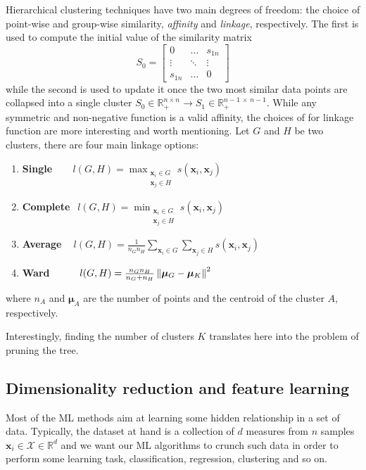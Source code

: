	Hierarchical clustering techniques have two main degrees of freedom: the choice of point-wise and group-wise similarity, \aka \textit{affinity} and \textit{linkage}, respectively. The first is used to compute the initial value of the similarity matrix
	$$
	S_0 = \begin{bmatrix}
	0       & \dots & s_{1n} \\
	\vdots & \ddots & \vdots \\
	s_{1n}       & \dots & 0
	\end{bmatrix}
	$$
	while the second is used to update it once the two most similar data points are collapsed into a single cluster $S_0 \in \mathbb{R}_+^{n \times n} \rightarrow S_1 \in \mathbb{R}_+^{n-1\,\times\,n-1}$.
	While any symmetric and non-negative function is a valid affinity, the choices of for linkage function are more interesting and worth mentioning.
	Let $G$ and $H$ be two clusters, there are four main linkage options:
	\begin{enumerate}
		\item[] \textbf{Single} $~~~~~~~~l(G,H) = \max_{\substack{\bm{x}_i \in G \\ \bm{x}_j \in H}} s(\bm{x}_i, \bm{x}_j)$

		\item[] \textbf{Complete} $~~l(G,H) = \min_{\substack{\bm{x}_i \in G \\ \bm{x}_j \in H}} s(\bm{x}_i, \bm{x}_j)$
		
		\item[] \textbf{Average} $~~~~l(G,H) = \frac{1}{n_G n_H} \sum_{\bm{x}_i \in G} \sum_{\bm{x}_j \in H} s(\bm{x}_i, \bm{x}_j)$
		
		\item[] \textbf{Ward} $~~~~~~~~l(G,H) = \frac{n_G n_H}{n_G + n_H} \left\lVert\bm{\mu}_G - \bm{\mu}_K\right\rVert^2$
	\end{enumerate}
	where $n_A$ and $\bm{\mu}_A$ are the number of points and the centroid of the cluster $A$, respectively.
	
	Interestingly, finding the number of clusters $K$ translates here into the problem of pruning the tree.
    
    \subsection{Dimensionality reduction and feature learning} \label{sec:dimred}
	Most of the ML methods aim at learning some hidden relationship in a set of data.
	Typically, the dataset at hand is a collection of $d$ measures from $n$ samples $\bm{x}_i \in \mathcal{X} \in \mathbb{R}^d$ and we want our ML algorithms to crunch such data in order to perform some learning task, \eg classification, regression, clustering and so on.
	
